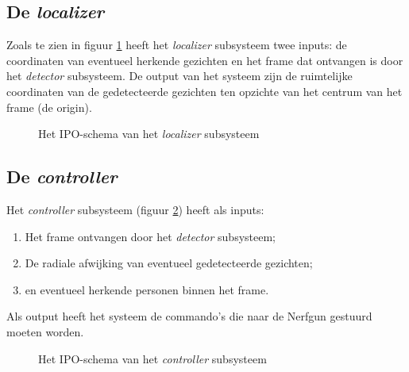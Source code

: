 \subsection{De \emph{localizer}}

Zoals te zien in figuur \ref{fig:ipo-localizer} heeft het \emph{localizer}
subsysteem twee inputs: de coordinaten van eventueel herkende gezichten en
het frame dat ontvangen is door het \emph{detector} subsysteem. De output
van het systeem zijn de ruimtelijke coordinaten van de gedetecteerde gezichten
ten opzichte van het centrum van het frame (de origin).

\begin{figure}[H]
    \begin{center}
        
    \end{center}
    \caption{Het IPO-schema van het \emph{localizer} subsysteem}
    \label{fig:ipo-localizer}
\end{figure}

\subsection{De \emph{controller}}

Het \emph{controller} subsysteem (figuur \ref{fig:ipo-controller}) heeft als inputs:

\begin{enumerate}
    \item Het frame ontvangen door het \emph{detector} subsysteem;
    \item De radiale afwijking van eventueel gedetecteerde gezichten;
    \item en eventueel herkende personen binnen het frame.
\end{enumerate}

Als output heeft het systeem de commando's die naar de Nerfgun gestuurd moeten
worden.

\begin{figure}[H]
    \begin{center}
        
    \end{center}
    \caption{Het IPO-schema van het \emph{controller} subsysteem}
    \label{fig:ipo-controller}
\end{figure}
